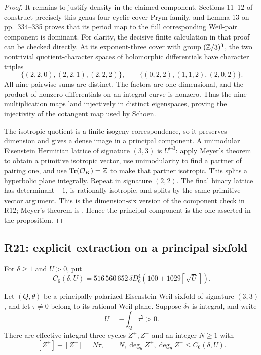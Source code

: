 \begin{proof}
It remains to justify density in the claimed component. Sections 11--12 of \cite[pp.~333--334]{Schoen1998} construct precisely this genus-four cyclic-cover Prym family, and Lemma 13 on pp.~334--335 proves that its period map to the full corresponding Weil-pair component is dominant. For clarity, the decisive finite calculation in that proof can be checked directly. At its exponent-three cover with group $(\mathbb Z/3)^3$, the two nontrivial quotient-character spaces of holomorphic differentials have character triples
\[
\{(2,2,0),(2,2,1),(2,2,2)\},\qquad
\{(0,2,2),(1,1,2),(2,0,2)\}.
\]
All nine pairwise sums are distinct. The factors are one-dimensional, and the product of nonzero differentials on an integral curve is nonzero. Thus the nine multiplication maps land injectively in distinct eigenspaces, proving the injectivity of the cotangent map used by Schoen.

The isotropic quotient is a finite isogeny correspondence, so it preserves dimension and gives a dense image in a principal component. A unimodular Eisenstein Hermitian lattice of signature $(3,3)$ is $U^{\oplus3}$: apply Meyer's theorem to obtain a primitive isotropic vector, use unimodularity to find a partner of pairing one, and use $\operatorname{Tr}(\mathcal O_K)=\mathbb Z$ to make that partner isotropic. This splits a hyperbolic plane integrally. Repeat in signature $(2,2)$. The final binary lattice has determinant $-1$, is rationally isotropic, and splits by the same primitive-vector argument. This is the dimension-six version of the component check in R12; Meyer's theorem is \cite[Corollary 3.3.4]{PetersSterk}. Hence the principal component is the one asserted in the proposition.
\end{proof}

\subsection{R21: explicit extraction on a principal sixfold}

For $\delta\geq1$ and $U>0$, put
\begin{equation}
C_6(\delta,U)=516\,560\,652\,\delta D_6^4
\left(100+1029\left\lceil\sqrt U\right\rceil\right).
\label{eq:C6}
\end{equation}

\begin{theorem}[R21]
\label{thm:R21}
Let $(Q,\theta)$ be a principally polarized Eisenstein Weil sixfold of signature $(3,3)$, and let $\tau\ne0$ belong to its rational Weil plane. Suppose $\delta\tau$ is integral, and write
\[
U=-\int_Q\tau^2>0.
\]
There are effective integral three-cycles $Z^+,Z^-$ and an integer $N\geq1$ with
\[
[Z^+]-[Z^-]=N\tau,\qquad
N,\deg_\theta Z^+,\deg_\theta Z^-\leq C_6(\delta,U).
\]
\end{theorem}

